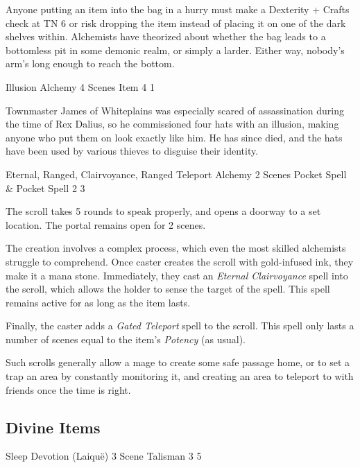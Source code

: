 \begin{multicols}{2}
Anyone putting an item into the bag in a hurry must make a Dexterity + Crafts check at TN 6 or risk dropping the item instead of placing it on one of the dark shelves within.  Alchemists have theorized about whether the bag leads to a bottomless pit in some demonic realm, or simply a larder.  Either way, nobody's arm's long enough to reach the bottom.

	{Illusion}%
	{Alchemy}%
	{4 Scenes}%
	{Item}%
	{4}%
	{1}%

Townmaster James of Whiteplains was especially scared of assassination during the time of Rex Dalius, so he commissioned four hats with an illusion, making anyone who put them on look exactly like him.
He has since died, and the hats have been used by various thieves to disguise their identity.

	{Eternal, Ranged, Clairvoyance, Ranged Teleport}%
	{Alchemy}%
	{2 Scenes}%
	{Pocket Spell \& Pocket Spell}%
	{2}%
	{3}%

\label{portalscroll}

The scroll takes 5 rounds to speak properly, and opens a doorway to a set location.
The portal remains open for 2 scenes.

The creation involves a complex process, which even the most skilled alchemists struggle to comprehend.
Once caster creates the scroll with gold-infused ink, they make it a mana stone.
Immediately, they cast an \textit{Eternal Clairvoyance} spell into the scroll, which allows the holder to sense the target of the spell.
This spell remains active for as long as the item lasts.

Finally, the caster adds a \textit{Gated Teleport} spell to the scroll.
This spell only lasts a number of scenes equal to the item's \textit{Potency} (as usual).

Such scrolls generally allow a mage to create some safe passage home, or to set a trap an area by constantly monitoring it, and creating an area to teleport to with friends once the time is right.

\subsection{Divine Items}

	{Sleep}%
	{Devotion (Laiqu\"{e})}%
	{3 Scene}%
	{Talisman}%
	{3}%
	{5}%


\end{multicols}

